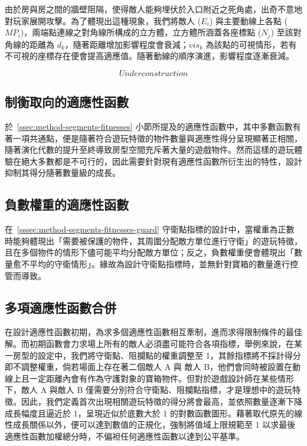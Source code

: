 由於房與房之間的牆壁阻隔，使得敵人能夠埋伏於入口附近之死角處，出奇不意地對玩家展開攻擊。為了體現出這種現象，我們將敵人 ($E_{i}$) 與主要動線上各點 ($MP_{i}$)，兩端點連線之對角線所構成的立方體，立方體所涵蓋各座標點 ($N_{j}$) 至該對角線的距離為 $d_{k}$，隨著距離增加影響程度會衰減；$vis_{k}$ 為該點的可視情形，若有不可視的座標存在便會提高適應值。隨著動線的順序演進，影響程度逐漸衰減。

\begin{equation}
Under construction
\end{equation}

\subsection{制衡取向的適應性函數}
\label{ssec:method-segments-balancefitness}

於~\ref{ssec:method-segments-fitnesses} 小節所提及的適應性函數中，其中多數函數有著一項共通點，便是隨著符合遊玩特徵的物件數量與適應性得分呈現顯著正相關，隨著演化代數的提升至終導致房型空間充斥著大量的遊戲物件。然而這樣的遊玩體驗在絕大多數都是不可行的，因此需要針對現有適應性函數所衍生出的特性，設計抑制其得分隨著數量級的成長。

\subsection{負數權重的適應性函數}
\label{ssec:method-segments-minusscores}

在~\ref{sssec:method-segments-fitnesses-guard} 守衛點指標的設計中，當權重為正數時能夠體現出「需要被保護的物件，其周圍分配敵方單位進行守衛」的遊玩特徵，且在多個物件的情形下儘可能平均分配敵方單位；反之，負數權重便會體現出「數量愈不平均的守衛情形」。緣故為設計守衛點指標時，並無針對寶箱的數量進行控管而導致。

\subsection{多項適應性函數合併}
\label{ssec:method-segments-multiobjectives}

在設計適應性函數初期，為求多個適應性函數相互牽制，進而求得限制條件的最佳解。而初期函數會力求場上所有的敵人必須盡可能符合各項指標，舉例來說，在某一房型的設定中，我們將守衛點、阻攔點的權重調整至 1，其餘指標將不採計得分即不調整權重，倘若場面上存在著二個敵人 A 與 敵人 B，他們會同時被設置在動線上且一定距離內會有作為守護對象的寶箱物件。但對於遊戲設計師在某些情形下，敵人 A 與敵人 B 僅需要分別符合守衛點、阻攔點指標，才是理想中的遊玩特徵。因此，我們定義首次出現相關遊玩特徵的得分將會最高，並依照數量逐漸下降成長幅度且逼近於 1，呈現近似於底數大於 1 的對數函數圖形。藉著取代原先的線性成長關係以外，便可以達到數值的正規化，強制將值域上限規範至 1 以求最後適應性函數加權總分時，不偏袒任何適應性函數以達到公平基準。

